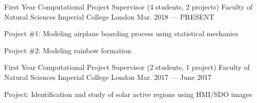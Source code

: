 
\begin{cventries}

  \cventry
    {First Year Computational Project Supervisor (4 students, 2 projects)} %
    {Faculty of Natural Sciences} %
    {Imperial College London} %
    {Mar. 2018 --- PRESENT} %
    {
      \begin{cvitems} %
        \item {Project \#1: Modeling airplane boarding process using statistical mechanics}
        \item {Project \#2: Modeling rainbow formation}
      \end{cvitems}
    }

  \cventry
    {First Year Computational Project Supervisor (2 students, 1 project)} %
    {Faculty of Natural Sciences} %
    {Imperial College London} %
    {Mar. 2017 --- June 2017} %
    {
      \begin{cvitems} %
        \item {Project: Identification and study of solar active regions using HMI/SDO images}
      \end{cvitems}
    }


\end{cventries}

